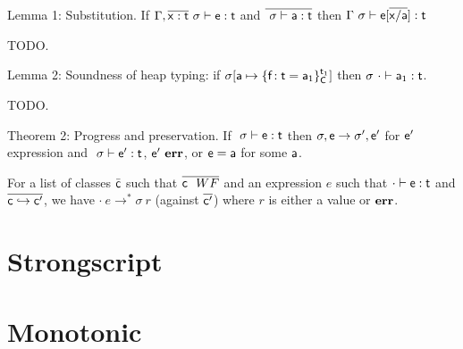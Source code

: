 \documentclass{report}
\newcommand{\e}{\M{\xt{e}}}
\newcommand{\f}{\M{\xt{f}}}
\newcommand{\x}{\M{\xt{x}}}
\renewcommand{\t}{\M{\xt{t}}}
\renewcommand{\c}{\M{\xt{c}}}
\newcommand{\C}{\M{\xt{C}}}
\newcommand{\err}{\M{\bt{err}}}
\newcommand{\s}{\M{\sigma}}
\renewcommand{\a}{\M{\xt a}}
\newcommand{\tp}[1]{\M{ \t_{#1} }}
\newcommand{\ap}[1]{\M{ \a_{#1} }}
\newcommand{\HT}[2]{\M{{#1}\!:{#2}}}
\newcommand{\Fdef}[3]{\M{ \HT{#1}{#2}={#3} }}
\newcommand{\is}{\M{\mapsto}}
\newcommand{\Obj}[3]{ \M{\{ #1 \}^{#2}_{#3}}}
\newcommand{\Heap}[2]{\M{ #1[ #2 ] }}
\newcommand{\M}[1]{\ensuremath{#1}\xspace}
\newcommand{\xt}[1]{{\sf{#1}}\xspace}
\newcommand{\bt}[1]{\xt{\bf #1}}
\renewcommand{\b}[1]{\M{\overline{#1}}}
\newcommand{\Bind}[2]{\M{#1 \is #2}}
\newcommand{\EnvType}[3]{ \M{#1 \vdash #2 : #3}}
\newcommand{\E}{\M{\Gamma}}
\newcommand{\Es}{\E ~\s}
\newcommand{\TransClass}[2]{\M{ #1 \hookrightarrow #2 }}
\begin{document}
Lemma 1: Substitution. If $\EnvType{\E,\b{\x:\t} ~ \s}{\e}{\t}$ and $\b{\EnvType{~\s}{\a}{\t}}$ then $\EnvType{\Es}{\e[\b{\x/\a}]}{\t}$

TODO.

Lemma 2: Soundness of heap typing: if $\Heap{\s}{\Bind{\a}{\Obj{\Fdef\f\t{\ap1}}{\tp1}\C}}$ then $\EnvType{\s~\cdot}{\ap1}{\t}$.

TODO.

Theorem 2: Progress and preservation. If $\EnvType{~\s}{\e}{\t}$ then $\s,\e \rightarrow \s',\e'$ for $\e'$ expression and $\EnvType{~\s}{\e'}{\t}$, $\e' ~ \err$, or $\e = \a$ for some $\a$.

For a list of classes $\bar{\c}$ such that $\b{\c ~~ WF}$ and an expression $e$ such that $\EnvType\cdot\e\t$ and $\b{\TransClass\c{\c'}}$, we have $\cdot~e \rightarrow^* \sigma~r$ (against $\b{\c'}$) where $r$ is either a value or $\err$.


\section{Strongscript}
\section{Monotonic}
\end{document}
